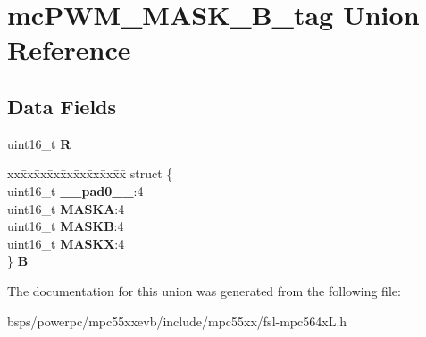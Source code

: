 \hypertarget{unionmcPWM__MASK__16B__tag}{}\section{mc\+P\+W\+M\+\_\+\+M\+A\+S\+K\+\_\+B\+\_\+tag Union Reference}
\label{unionmcPWM__MASK__16B__tag}
\subsection*{Data Fields}
\begin{DoxyCompactItemize}
\item 
\mbox{\label{unionmcPWM__MASK__16B__tag_a1296e791050f2451ca04fdf7f1ba2bfb}} 
uint16\+\_\+t {\bfseries R}
\item 
\mbox{\label{unionmcPWM__MASK__16B__tag_a217c72305cd8cda0c3aa0d4b5804c8ae}} 
\begin{tabbing}
xx\=xx\=xx\=xx\=xx\=xx\=xx\=xx\=xx\=\kill
struct \{\\
\>uint16\_t {\bfseries \_\_pad0\_\_}:4\\
\>uint16\_t {\bfseries MASKA}:4\\
\>uint16\_t {\bfseries MASKB}:4\\
\>uint16\_t {\bfseries MASKX}:4\\
\} {\bfseries B}\\

\end{tabbing}\end{DoxyCompactItemize}


The documentation for this union was generated from the following file\+:\begin{DoxyCompactItemize}
\item 
bsps/powerpc/mpc55xxevb/include/mpc55xx/fsl-\/mpc564x\+L.\+h\end{DoxyCompactItemize}
